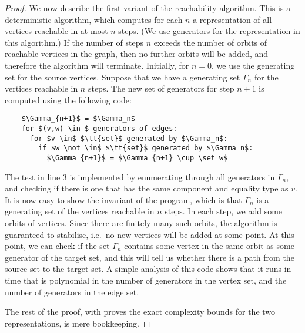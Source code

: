 \begin{proof}
We now describe the first variant of the reachability algorithm. This is a deterministic algorithm, which computes for each $n$ a representation  of all vertices reachable in at most $n$ steps. (We use generators for the representation in this algorithm.) If the number of steps $n$ exceeds the number of orbits of  reachable vertices in the graph, then no further orbits will be added, and therefore the algorithm will terminate. Initially, for $n=0$, we use the generating set for the source vertices.  Suppose that we have a generating set $\Gamma_n$ for the vertices reachable in $n$ steps. The new set of generators for step $n+1$ is computed using the following code:
\begin{lstlisting}
    $\Gamma_{n+1}$ = $\Gamma_n$
    for $(v,w) \in $ generators of edges: 
      for $v \in$ $\tt{set}$ generated by $\Gamma_n$: 
        if $w \not \in$ $\tt{set}$ generated by $\Gamma_n$:
          $\Gamma_{n+1}$ = $\Gamma_{n+1} \cup \set w$
\end{lstlisting}
The test in line 3 is implemented by enumerating through all generators in $\Gamma_n$, and checking if there is one that has the same component and equality type as $v$. It is now easy to show the invariant of the program, which is that $\Gamma_n$ is a generating set of the vertices reachable in $n$ steps. In each step, we add some orbits of vertices. Since there are finitely many such orbits, the algorithm is guaranteed to stabilise, i.e.~no new vertices will be added at some point. At this point, we can check if the set $\Gamma_n$ contains some vertex in the same orbit as some generator of the target set, and this will tell us whether there is a path from the source set to the target set. A simple analysis of this code shows that it runs in time that is polynomial in the number of generators in the vertex set, and the number of generators in the edge set.  



The rest of the proof, with proves the exact complexity bounds for the two representations, is mere bookkeeping.


\end{proof}
